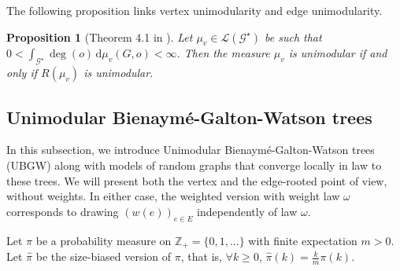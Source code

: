 \documentclass[11pt]{article}
\newtheorem{prop}{Proposition}[section]
\begin{document}
\bigskip

The following proposition links vertex unimodularity and edge unimodularity.
\begin{prop}[Theorem 4.1 in \cite{aldous2018processes}]
Let $\mu_v \in \mathcal{L}(\mathcal{G}^{\star})$ be such that $0<\int_{\mathcal G^{\star}} \deg (o) \, \mathrm{d} \mu_v(G,o) < \infty$.
Then the measure $\mu_v$ is unimodular if and only if $R(\mu_v)$ is unimodular.
\end{prop}


\subsection{Unimodular Bienaymé-Galton-Watson trees}\label{subsec:UBGW}
In this subsection, we introduce Unimodular Bienaymé-Galton-Watson trees (UBGW) along with models of random graphs that converge locally in law to these trees. We will present both the vertex and the edge-rooted point of view, without weights. In either case, the weighted version with weight law $\omega$ corresponds to drawing $(w(e))_{e \in E}$ independently of law $\omega$.


Let $\pi$ be a probability measure on $\mathbb{Z}_+ = \{0,1, ... \}$ with finite expectation $m > 0$. Let $\hat{\pi}$ be the size-biased version of $\pi$, that is, $\forall k \geq 0$, $\hat{\pi} (k) =\frac{k}{m} \pi (k)$. 
\end{document}
